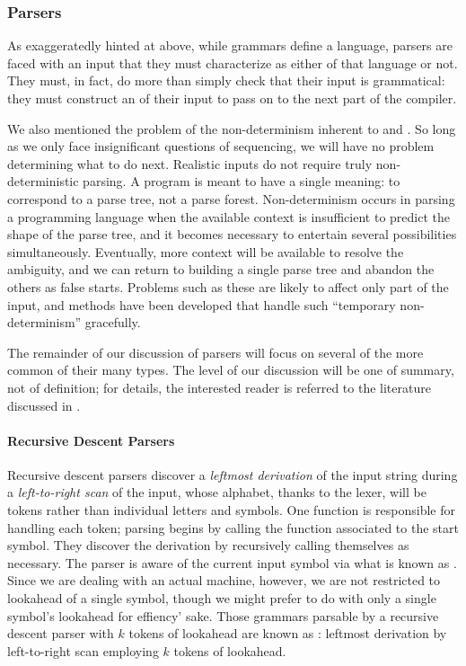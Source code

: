 \subsubsection{Parsers}
As exaggeratedly hinted at above, while grammars define a language, parsers are faced with an input that they must characterize as either of that language or not. They must, in fact, do more than simply check that their input is grammatical: they must construct an \IR of their input to pass on to the next part of the compiler.

We also mentioned the problem of the non-determinism inherent to \CFGs and \PDAs. So long as we only face insignificant questions of sequencing, we will have no problem determining what to do next. Realistic inputs do not require truly non-deterministic parsing. A program is meant to have a single meaning: to correspond to a parse tree, not a parse forest. Non-determinism occurs in parsing a programming language when the available context is insufficient to predict the shape of the parse tree, and it becomes necessary to entertain several possibilities simultaneously. Eventually, more context will be available to resolve the ambiguity, and we can return to building a single parse tree and abandon the others as false starts. Problems such as these are likely to affect only part of the input, and methods have been developed that handle such ``temporary non-determinism'' gracefully. %

The remainder of our discussion of parsers will focus on several of the more common of their many types. The level of our discussion will be one of summary, not of definition; for details, the interested reader is referred to the literature discussed in .

\paragraph{Recursive Descent Parsers}
Recursive descent parsers discover a \emph{leftmost derivation} of the input string during a \emph{left-to-right scan} of the input, whose alphabet, thanks to the lexer, will be tokens rather than individual letters and symbols. One function is responsible for handling each token; parsing begins by calling the function associated to the start symbol. They discover the derivation by recursively calling themselves as necessary. The parser is aware of the current input symbol via what is known as . Since we are dealing with an actual machine, however, we are not restricted to lookahead of a single symbol, though we might prefer to do with only a single symbol's lookahead for effiency' sake. Those grammars parsable by a recursive descent parser with $k$ tokens of lookahead are known as : leftmost derivation by left-to-right scan employing $k$ tokens of lookahead.

